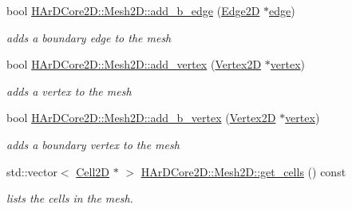 \begin{DoxyCompactItemize}
\mbox{\label{group__Mesh2D_ga4b7d71e891c3141a4dea979c8dda2a99}} 
bool \hyperlink{group__Mesh2D_ga4b7d71e891c3141a4dea979c8dda2a99}{H\+Ar\+D\+Core2\+D\+::\+Mesh2\+D\+::add\+\_\+b\+\_\+edge} (\hyperlink{classHArDCore2D_1_1Edge2D}{Edge2D} $\ast$\hyperlink{classHArDCore2D_1_1Mesh2D_a9dd54d7b118e6f645d9af819a7555e93}{edge})
\begin{DoxyCompactList}\small\item\em adds a boundary edge to the mesh \end{DoxyCompactList}\item 
\mbox{\label{group__Mesh2D_gab7fe3d51faf7828161648636ddaebfa1}} 
bool \hyperlink{group__Mesh2D_gab7fe3d51faf7828161648636ddaebfa1}{H\+Ar\+D\+Core2\+D\+::\+Mesh2\+D\+::add\+\_\+vertex} (\hyperlink{classHArDCore2D_1_1Vertex2D}{Vertex2D} $\ast$\hyperlink{classHArDCore2D_1_1Mesh2D_ac29a7c5c0c36b3aa519520fbb9cf20de}{vertex})
\begin{DoxyCompactList}\small\item\em adds a vertex to the mesh \end{DoxyCompactList}\item 
\mbox{\label{group__Mesh2D_gaa56f578853eec0ddba252cb2c0399986}} 
bool \hyperlink{group__Mesh2D_gaa56f578853eec0ddba252cb2c0399986}{H\+Ar\+D\+Core2\+D\+::\+Mesh2\+D\+::add\+\_\+b\+\_\+vertex} (\hyperlink{classHArDCore2D_1_1Vertex2D}{Vertex2D} $\ast$\hyperlink{classHArDCore2D_1_1Mesh2D_ac29a7c5c0c36b3aa519520fbb9cf20de}{vertex})
\begin{DoxyCompactList}\small\item\em adds a boundary vertex to the mesh \end{DoxyCompactList}\item 
\mbox{\label{group__Mesh2D_ga2392f5bac860bec56d9f53eec9746ea5}} 
std\+::vector$<$ \hyperlink{classHArDCore2D_1_1Cell2D}{Cell2D} $\ast$ $>$ \hyperlink{group__Mesh2D_ga2392f5bac860bec56d9f53eec9746ea5}{H\+Ar\+D\+Core2\+D\+::\+Mesh2\+D\+::get\+\_\+cells} () const
\begin{DoxyCompactList}\small\item\em lists the cells in the mesh. \end{DoxyCompactList}\item 
\mbox{\label{group__Mesh2D_ga5320100a180fdbe7de5547c05a6d48fd}} 

\end{DoxyCompactItemize}

